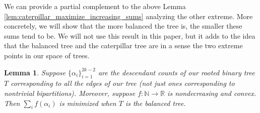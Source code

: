 \documentclass[10pt,oneside,reqno]{article}
\theoremstyle{plain}
\newtheorem{lemma}[theorem]{Lemma}
\theoremstyle{definition}
\numberwithin{equation}{section}
\newcommand{\R}{\mathbb{R}}
\newcommand{\N}{\mathbb{N}}
\begin{document}
\noindent We can provide a partial complement to the above Lemma \ref{lem:caterpillar_maximize_increasing_sums} analyzing the other extreme. More concretely, we will show that the more balanced the tree is, the smaller these sums tend to be. We will not use this result in this paper, but it adds to the idea that the balanced tree and the caterpillar tree are in a sense the two extreme points in our space of trees.

\begin{lemma}
 Suppose $\{\alpha_{i}\}_{i=1}^{2k-2}$ are the descendant counts of our rooted binary tree $T$ corresponding to \textit{all} the edges of our tree (not just ones corresponding to nontrivial bipartitions). Moreover, suppose $f: \N \to \R$ is nondecreasing and convex. Then $\sum_i f(\alpha_{i})$ is minimized when $T$ is the balanced tree.
 \label{lem:balanced_trees_minimize_increasing_convex_sums}
\end{lemma}
\end{document}
